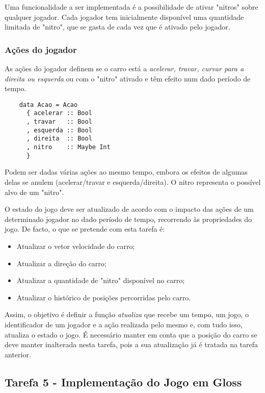 \documentclass[a4paper]{report}
\begin{document}
Uma funcionalidade a ser implementada é a possibilidade de ativar "nitros" sobre qualquer jogador. Cada jogador tem inicialmente disponível uma quantidade limitada de "nitro", que se gasta de cada vez que é ativado pelo jogador.

\subsubsection{Ações do jogador}

As ações do jogador definem se o carro está a \textit{acelerar, travar, curvar para a direita ou esquerda} ou com o "nitro" ativado e têm efeito num dado período de tempo.

\begin{verbatim}
    data Acao = Acao
      { acelerar :: Bool
      , travar   :: Bool
      , esquerda :: Bool
      , direita  :: Bool
      , nitro    :: Maybe Int
      }
\end{verbatim}

Podem ser dadas várias ações ao mesmo tempo, embora os efeitos de algumas delas se anulem (acelerar/travar e esquerda/direita). O nitro representa o possível alvo de um "nitro".

O estado do jogo deve ser atualizado de acordo com o impacto das ações de um determinado jogador no dado período de tempo, recorrendo às propriedades do jogo. De facto, o que se pretende com esta tarefa é:

\begin{itemize}
    \item Atualizar o vetor velocidade do carro;
    \item Atualizar a direção do carro;
    \item Atualizar a quantidade de "nitro" disponível no carro;
    \item Atualizar o histórico de posições percorridas pelo carro.
\end{itemize}

Assim, o objetivo é definir a função \textit{atualiza} que recebe um tempo, um jogo, o identificador de um jogador e a ação realizada pelo mesmo e, com tudo isso, atualiza o estado o jogo. É necessário manter em conta que a posição do carro se deve manter inalterada nesta tarefa, pois a sua atualização já é tratada na tarefa anterior.

\subsection{Tarefa 5 - Implementação do Jogo em Gloss}
\label{analisetarefa5}
\end{document}
